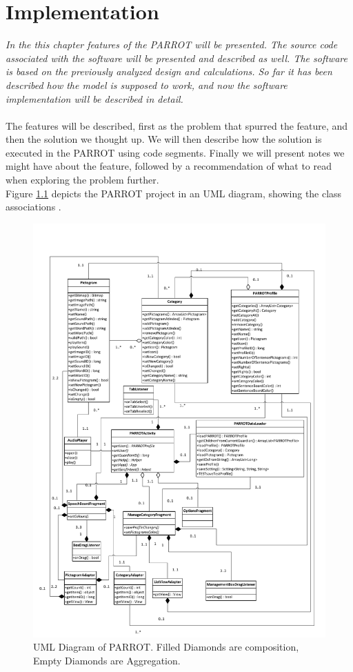 \chapter{Implementation}
\label{imp}
\textit{In the this chapter features of the PARROT will be presented. The source code associated with the software will be presented and described as well. The software is based on the previously analyzed design and calculations. So far it has been described how the model is supposed to work, and now the software implementation will be described in detail.}\\
\\
The features will be described, first as the problem that spurred the feature, and then the solution we thought up. 
We will then describe how the solution is executed in the PARROT using code segments. Finally we will present notes we might have about the feature, followed by a recommendation of what to read when exploring the problem further.\\

Figure \ref{fig:ClassUMLPARROTPDF} depicts the PARROT project in an UML diagram, showing the class associations .

\begin{figure}
	\centering
		\includegraphics[width=1.0\textwidth]{input/images/ClassUMLPARROTPDF.pdf}
	\caption{UML Diagram of PARROT. Filled Diamonds are composition, Empty Diamonds are Aggregation.}
	\label{fig:ClassUMLPARROTPDF}
\end{figure}


